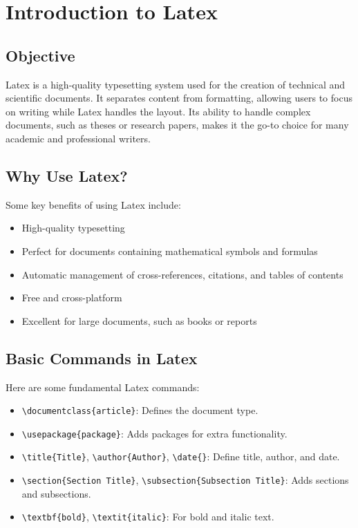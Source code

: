 \section{Introduction to Latex}
\subsection {Objective}
Latex is a high-quality typesetting system used for the creation of technical and scientific documents. It separates content from formatting, allowing users to focus on writing while Latex handles the layout. Its ability to handle complex documents, such as theses or research papers, makes it the go-to choice for many academic and professional writers.


\subsection{Why Use Latex?}
Some key benefits of using Latex{} include:
\begin{itemize}
    \item High-quality typesetting
    \item Perfect for documents containing mathematical symbols and formulas
    \item Automatic management of cross-references, citations, and tables of contents
    \item Free and cross-platform
    \item Excellent for large documents, such as books or reports
\end{itemize}

\subsection{Basic Commands in Latex}
Here are some fundamental Latex{} commands:
\begin{itemize}
    \item \texttt{\textbackslash documentclass\{article\}}: Defines the document type.
    \item \texttt{\textbackslash usepackage\{package\}}: Adds packages for extra functionality.
    \item \texttt{\textbackslash title\{Title\}}, \texttt{\textbackslash author\{Author\}}, \texttt{\textbackslash date\{\}}: Define title, author, and date.
    \item \texttt{\textbackslash section\{Section Title\}}, \texttt{\textbackslash subsection\{Subsection Title\}}: Adds sections and subsections.
    \item \texttt{\textbackslash textbf\{bold\}}, \texttt{\textbackslash textit\{italic\}}: For bold and italic text.
\end{itemize}


